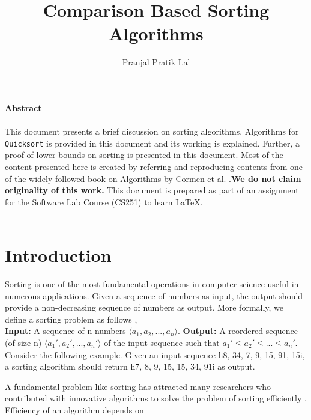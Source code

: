 \documentclass{article}
\author{Pranjal Pratik Lal}
\date{}
\begin{document}
\title{Comparison Based Sorting Algorithms}
\maketitle
\begin{multicols}{2}
\noindent\textbf{\large Abstract}\\\\
This document presents a brief discussion on sorting
algorithms. Algorithms for \texttt{Quicksort} is provided
in this document and its working is explained.
Further, a proof of lower bounds on sorting is presented
in this document. Most of the content presented
here is created by referring and reproducing
contents from one of the widely followed book on
Algorithms by Cormen et al. \citep{1}.\textbf{We do not claim
originality of this work.} This document is prepared
as part of an assignment for the Software Lab
Course (CS251) to learn \LaTeX.\\\\
\noindent{}
\noindent\section{Introduction}
Sorting is one of the most fundamental operations
in computer science useful in numerous applications.
Given a sequence of numbers as input, the
output should provide a non-decreasing sequence
of numbers as output. More formally, we define a
sorting problem as follows \citep{1},\\
\textbf{Input:} A sequence of n numbers $\langle a_{1}, a_{2}, ..., a_{n} \rangle$.
\textbf{Output:} A reordered sequence (of size n)
$\langle a_{1}', a_{2}', ..., a_{n}' \rangle$ of the input sequence such that $a_{1}' \leq a_{2}' \leq . . . \leq a_{n}'$.\\
Consider the following example. Given an input
sequence h8, 34, 7, 9, 15, 91, 15i, a sorting algorithm
should return h7, 8, 9, 15, 15, 34, 91i as output.\par
A fundamental problem like sorting has attracted
many researchers who contributed with innovative
algorithms to solve the problem of sorting efficiently \citep{3}. Efficiency of an algorithm depends on

\end{multicols}
\end{document}
